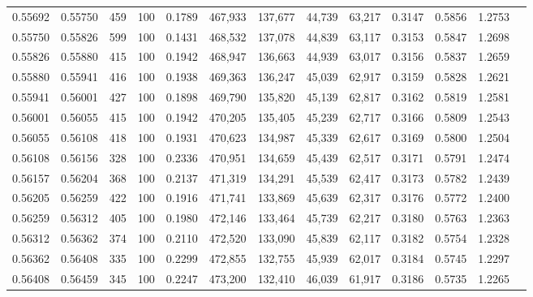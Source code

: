 \begin{tabular}{rrrrrrrrrrrrr}
0.55692 & 0.55750 &   459 & 100 &                                     0.1789 & 467,933 & 137,677 &  44,739 &  63,217 & 0.3147 & 0.5856 & 1.2753 \\
0.55750 & 0.55826 &   599 & 100 &                                     0.1431 & 468,532 & 137,078 &  44,839 &  63,117 & 0.3153 & 0.5847 & 1.2698 \\
0.55826 & 0.55880 &   415 & 100 &                                     0.1942 & 468,947 & 136,663 &  44,939 &  63,017 & 0.3156 & 0.5837 & 1.2659 \\
0.55880 & 0.55941 &   416 & 100 &                                     0.1938 & 469,363 & 136,247 &  45,039 &  62,917 & 0.3159 & 0.5828 & 1.2621 \\
0.55941 & 0.56001 &   427 & 100 &                                     0.1898 & 469,790 & 135,820 &  45,139 &  62,817 & 0.3162 & 0.5819 & 1.2581 \\
0.56001 & 0.56055 &   415 & 100 &                                     0.1942 & 470,205 & 135,405 &  45,239 &  62,717 & 0.3166 & 0.5809 & 1.2543 \\
0.56055 & 0.56108 &   418 & 100 &                                     0.1931 & 470,623 & 134,987 &  45,339 &  62,617 & 0.3169 & 0.5800 & 1.2504 \\
0.56108 & 0.56156 &   328 & 100 &                                     0.2336 & 470,951 & 134,659 &  45,439 &  62,517 & 0.3171 & 0.5791 & 1.2474 \\
0.56157 & 0.56204 &   368 & 100 &                                     0.2137 & 471,319 & 134,291 &  45,539 &  62,417 & 0.3173 & 0.5782 & 1.2439 \\
0.56205 & 0.56259 &   422 & 100 &                                     0.1916 & 471,741 & 133,869 &  45,639 &  62,317 & 0.3176 & 0.5772 & 1.2400 \\
0.56259 & 0.56312 &   405 & 100 &                                     0.1980 & 472,146 & 133,464 &  45,739 &  62,217 & 0.3180 & 0.5763 & 1.2363 \\
0.56312 & 0.56362 &   374 & 100 &                                     0.2110 & 472,520 & 133,090 &  45,839 &  62,117 & 0.3182 & 0.5754 & 1.2328 \\
0.56362 & 0.56408 &   335 & 100 &                                     0.2299 & 472,855 & 132,755 &  45,939 &  62,017 & 0.3184 & 0.5745 & 1.2297 \\
0.56408 & 0.56459 &   345 & 100 &                                     0.2247 & 473,200 & 132,410 &  46,039 &  61,917 & 0.3186 & 0.5735 & 1.2265 \\

\end{tabular}
